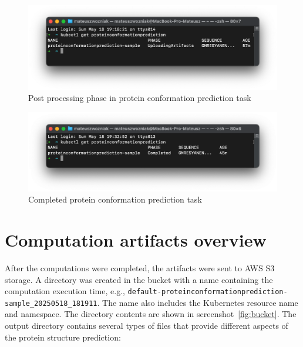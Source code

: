 \begin{figure}[htbp]
    \centering
    \includegraphics[width=\textwidth]{images/proteinconformationprediction_uploading_terminal}
    \caption{Post processing phase in protein conformation prediction task}
    \label{fig:proteinconformationprediction_uploading_terminal}
\end{figure}

\begin{figure}[htbp]
    \centering
    \includegraphics[width=\textwidth]{images/proteinconformationprediction_completed_terminal}
    \caption{Completed protein conformation prediction task}
    \label{fig:proteinconformationprediction_completed_terminal}
\end{figure}

\section{Computation artifacts overview}

After the computations were completed, the artifacts were sent to AWS S3 storage.
A directory was created in the bucket with a name containing the computation execution time, e.g., \texttt{default-proteinconformationprediction-sample\_20250518\_181911}.
The name also includes the Kubernetes resource name and namespace.
The directory contents are shown in screenshot~\ref{fig:bucket}.
The output directory contains several types of files that provide different aspects of the protein structure prediction:

